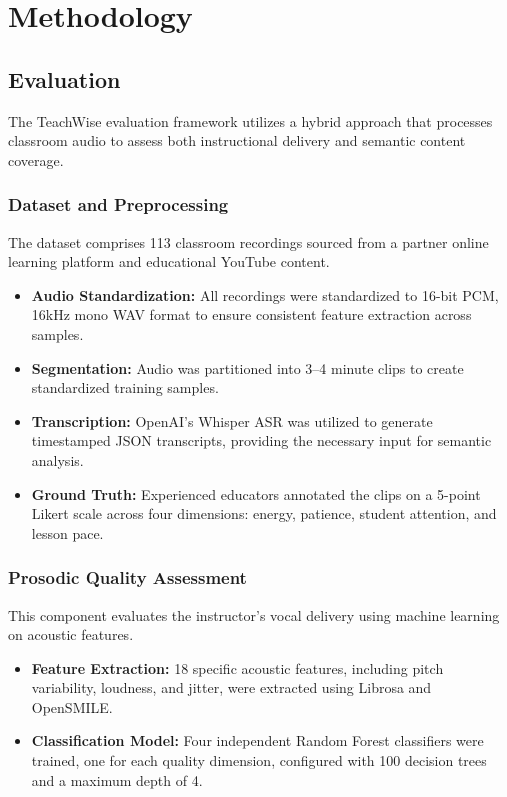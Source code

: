 
\section{Methodology}
\label{sec:methodology}

\subsection{Evaluation}
The TeachWise evaluation framework utilizes a hybrid approach that processes classroom audio to assess both instructional delivery and semantic content coverage.

\subsubsection{Dataset and Preprocessing}
The dataset comprises 113 classroom recordings sourced from a partner online learning platform and educational YouTube content. 
\begin{itemize}
    \item \textbf{Audio Standardization:} All recordings were standardized to 16-bit PCM, 16kHz mono WAV format to ensure consistent feature extraction across samples.
    \item \textbf{Segmentation:} Audio was partitioned into 3–4 minute clips to create standardized training samples.
    \item \textbf{Transcription:} OpenAI’s Whisper ASR was utilized to generate timestamped JSON transcripts, providing the necessary input for semantic analysis.
    \item \textbf{Ground Truth:} Experienced educators annotated the clips on a 5-point Likert scale across four dimensions: energy, patience, student attention, and lesson pace.
\end{itemize}

\subsubsection{Prosodic Quality Assessment}
This component evaluates the instructor's vocal delivery using machine learning on acoustic features.
\begin{itemize}
    \item \textbf{Feature Extraction:} 18 specific acoustic features, including pitch variability, loudness, and jitter, were extracted using Librosa and OpenSMILE.
    \item \textbf{Classification Model:} Four independent Random Forest classifiers were trained, one for each quality dimension, configured with 100 decision trees and a maximum depth of 4.
\end{itemize}

